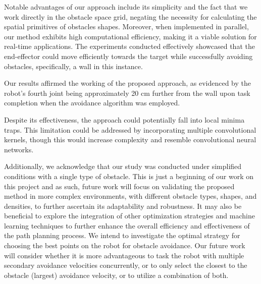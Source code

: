 \documentclass[a4paper]{article}
\begin{document}
Notable advantages of our approach include its simplicity and the fact that we work directly in the obstacle space grid, negating the necessity for calculating the spatial primitives of obstacles shapes. Moreover, when implemented in parallel, our method exhibits high computational efficiency, making it a viable solution for real-time applications. The experiments conducted effectively showcased that the end-effector could move efficiently towards the target while successfully avoiding obstacles, specifically, a wall in this instance.

Our results affirmed the working of the proposed approach, as evidenced by the robot's fourth joint being approximately 20 cm further from the wall upon task completion when the avoidance algorithm was employed.

Despite its effectiveness, the approach could potentially fall into local minima traps. This limitation could be addressed by incorporating multiple convolutional kernels, though this would increase complexity and resemble convolutional neural networks.

Additionally, we acknowledge that our study was conducted under simplified conditions with a single type of obstacle. This is just a beginning of our work on this project and as such, future work will focus on validating the proposed method in more complex environments, with different obstacle types, shapes, and densities, to further ascertain its adaptability and robustness. It may also be beneficial to explore the integration of other optimization strategies and machine learning techniques to further enhance the overall efficiency and effectiveness of the path planning process. We intend to investigate the optimal strategy for choosing the best points on the robot for obstacle avoidance. Our future work will consider whether it is more advantageous to task the robot with multiple secondary avoidance velocities concurrently, or to only select the closest to the obstacle (largest) avoidance velocity, or to utilize a combination of both.
\end{document}
